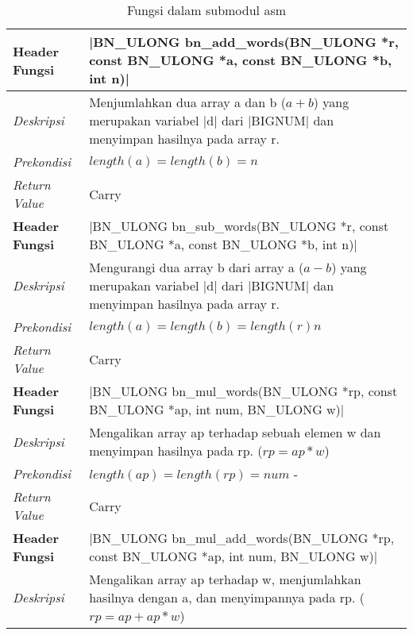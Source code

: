   \begin{table}[h]
    \caption{Fungsi dalam submodul asm}
    \begin{tabular}{R{2.8cm}L{10.5cm}}
      \toprule
      \textbf{Header Fungsi} & |BN_ULONG bn_add_words(BN_ULONG *r, const BN_ULONG *a, const BN_ULONG *b, int n)|  \\ \midrule
      \textit{Deskripsi} & Menjumlahkan dua array a dan b ($a+b$) yang merupakan variabel |d| dari |BIGNUM| dan menyimpan hasilnya pada array r.                                                                                     \\
      \textit{Prekondisi}    & $length(a) = length(b) = n$                                 \\
      \textit{Return Value}  & Carry
      \\ \bottomrule
      \textbf{Header Fungsi} & |BN_ULONG bn_sub_words(BN_ULONG *r, const BN_ULONG *a, const BN_ULONG *b, int n)|  \\ \midrule
      \textit{Deskripsi} & Mengurangi dua array b dari array a ($a-b$) yang merupakan variabel |d| dari |BIGNUM| dan menyimpan hasilnya pada array r.                                                                                     \\
      \textit{Prekondisi}    & $length(a) = length(b) = length(r) n$                                 \\
      \textit{Return Value}  & Carry
      \\ \bottomrule
      \textbf{Header Fungsi} & |BN_ULONG bn_mul_words(BN_ULONG *rp, const BN_ULONG *ap, int num, BN_ULONG w)|     \\ \midrule
      \textit{Deskripsi} & Mengalikan array ap terhadap sebuah elemen w dan menyimpan hasilnya pada rp. ($rp = ap * w$)                                                                                      \\
      \textit{Prekondisi}    & $length(ap) = length(rp) = num$ -                                                                                  \\
      \textit{Return Value}  & Carry
      \\ \bottomrule
      \textbf{Header Fungsi} & |BN_ULONG bn_mul_add_words(BN_ULONG *rp, const BN_ULONG *ap, int num, BN_ULONG w)| \\ \midrule
      \textit{Deskripsi} & Mengalikan array ap terhadap w, menjumlahkan hasilnya dengan a, dan menyimpannya pada rp. ($rp = ap + ap * w$)                                                                                    \\

\end{tabular}
\end{table}
